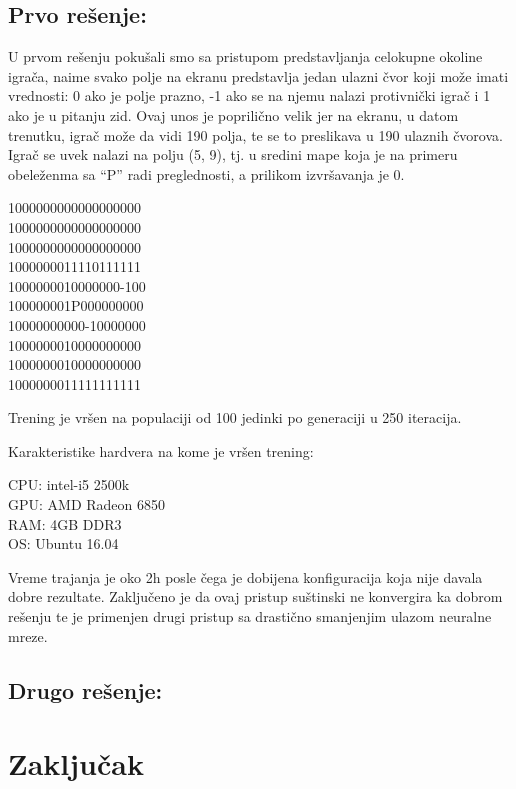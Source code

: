 \documentclass[a4paper]{article}
\begin{document}
\subsection {Prvo rešenje:}
\par U prvom rešenju pokušali smo sa pristupom predstavljanja celokupne okoline igrača, naime svako polje na ekranu predstavlja jedan ulazni čvor koji može imati vrednosti: 0 ako je polje prazno, -1 ako se na njemu nalazi protivnički igrač i 1 ako je u pitanju zid. Ovaj unos je poprilično velik jer na ekranu, u datom trenutku, igrač može da vidi 190 polja, te se to preslikava u 190 ulaznih čvorova.  Igrač se uvek nalazi na polju (5, 9), tj. u sredini mape koja je na primeru obeleženma sa  “P” radi preglednosti, a prilikom izvršavanja je 0.  

\begin{tcolorbox}

1000000000000000000 \\
1000000000000000000\\
1000000000000000000\\
1000000011110111111\\
1000000010000000-100\\
100000001P000000000\\
10000000000-10000000\\
1000000010000000000\\
1000000010000000000\\
1000000011111111111\\
\end{tcolorbox}

Trening je vršen na populaciji od 100 jedinki po generaciji u 250 iteracija.
\newline
\begin{tcolorbox}
\begin {center}
Karakteristike hardvera na kome je vršen trening: \\
\end {center}
CPU: intel-i5 2500k \\
GPU: AMD Radeon 6850 \\
RAM: 4GB DDR3 \\
OS: Ubuntu 16.04 \\
\end{tcolorbox}
\noindent Vreme trajanja je oko 2h posle čega je dobijena konfiguracija koja nije davala dobre rezultate. Zaključeno je da ovaj pristup suštinski ne konvergira ka dobrom rešenju te je primenjen drugi pristup sa drastično smanjenjim ulazom neuralne mreze.

\subsection {Drugo rešenje:}


 \newpage
\section{Zaključak}
\label{sec:zakljucak}


 

\end{document}
